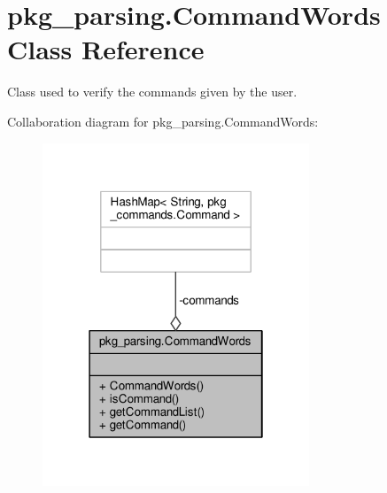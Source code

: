 \hypertarget{classpkg__parsing_1_1CommandWords}{\section{pkg\-\_\-parsing.\-Command\-Words Class Reference}
\label{classpkg__parsing_1_1CommandWords}
}


Class used to verify the commands given by the user.  




Collaboration diagram for pkg\-\_\-parsing.\-Command\-Words\-:\nopagebreak
\begin{figure}[H]
\begin{center}
\leavevmode
\includegraphics[width=226pt]{classpkg__parsing_1_1CommandWords__coll__graph}
\end{center}
\end{figure}
